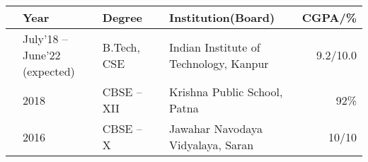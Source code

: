 
\newcommand{\education}[4]{
  & #1 & #2 & &#3 & #4
}
\begin{center}
\begin{tabular}{ | L{0.05cm} l | L{3cm} | L{0.05cm} C{7cm} | r |}
  \hline
  \education{\textbf{Year}}{\textbf{Degree}}{\textbf{Institution(Board)}}{\textbf{CGPA/\%}}\\
  \hline
  \education{July'18 -- June'22 (expected)}{B.Tech, CSE}{Indian Institute of Technology, Kanpur}{9.2/10.0}\\
  \hline
  \education{2018}{CBSE -- XII}{Krishna Public School, Patna }{92\%}\\
  \hline
  \education{2016}{CBSE -- X}{Jawahar Navodaya Vidyalaya, Saran }{10/10}\\
  \hline
\end{tabular}
\end{center}
\vspace{-4mm}

